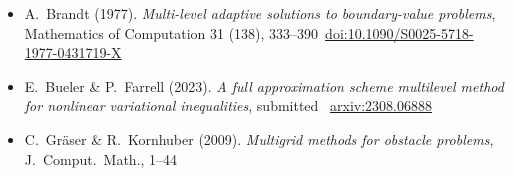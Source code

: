 
\newcommand{\sdoi}[1]{\,{\tiny \href{https://doi.org/#1}{doi:#1}}}
\begin{itemize}
\item A.~Brandt (1977). \emph{Multi-level adaptive solutions to boundary-value problems}, Mathematics of Computation 31 (138), 333--390 \sdoi{10.1090/S0025-5718-1977-0431719-X}
\item E.~Bueler \& P.~Farrell (2023).  \emph{A full approximation scheme multilevel method for nonlinear variational inequalities}, submitted \, {\tiny \href{https://arxiv.org/abs/2308.06888}{arxiv:2308.06888}}
\item C.~Gr{\"a}ser \& R.~Kornhuber (2009). \emph{Multigrid methods for obstacle problems}, J.~Comput.~Math., 1--44

\end{itemize}
